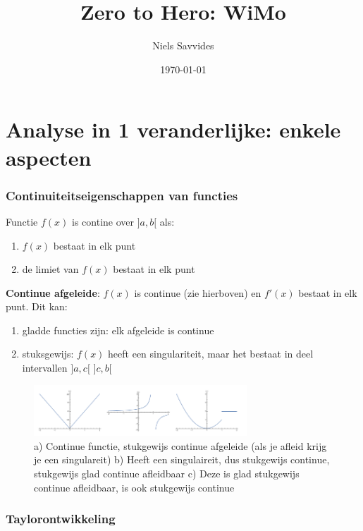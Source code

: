 \documentclass[a4paper]{report}
\title{Zero to Hero: WiMo}
\author{Niels Savvides}
\date{\today}
\begin{document}
\maketitle

\chapter{Analyse in 1 veranderlijke: enkele aspecten}

\subsection{Continuiteitseigenschappen van functies}

Functie $f(x)$ is contine over $]a,b[$ als:
\begin{enumerate}
	\item $f(x)$ bestaat in elk punt
	\item de limiet van $f(x)$ bestaat in elk punt
\end{enumerate}

\textbf{Continue afgeleide}: $f(x)$ is continue (zie hierboven) en $f'(x)$ bestaat in elk punt.
Dit kan:
\begin{enumerate}
	\item gladde functies zijn: elk afgeleide is continue
	\item stuksgewijs: $f(x)$ heeft een singulariteit, maar het bestaat in deel intervallen $]a, c[$ $]c, b[$
\end{enumerate}

\begin{figure}[!htbp]
	\begin{center}
		\includegraphics[width=8cm]{./images/continu.png}
	\end{center}
	\caption{a) Continue functie, stukgewijs continue afgeleide (als je afleid krijg je een singulareit) b) Heeft een singulaireit, dus stukgewijs continue, stukgewijs glad continue afleidbaar c) Deze is glad stukgewijs continue afleidbaar, is ook stukgewijs continue }
\end{figure}


\subsection{Taylorontwikkeling}
\label{sec:taylor}
\end{document}
